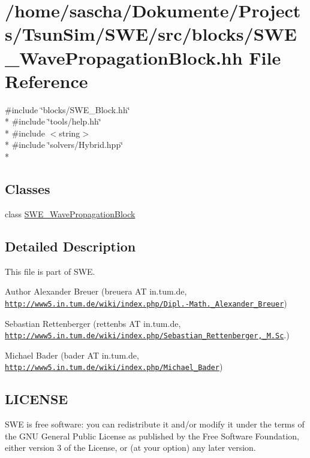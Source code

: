 \hypertarget{SWE__WavePropagationBlock_8hh}{\section{/home/sascha/\-Dokumente/\-Projects/\-Tsun\-Sim/\-S\-W\-E/src/blocks/\-S\-W\-E\-\_\-\-Wave\-Propagation\-Block.hh File Reference}
\label{SWE__WavePropagationBlock_8hh}
}
{\ttfamily \#include \char`\"{}blocks/\-S\-W\-E\-\_\-\-Block.\-hh\char`\"{}}\\*
{\ttfamily \#include \char`\"{}tools/help.\-hh\char`\"{}}\\*
{\ttfamily \#include $<$string$>$}\\*
{\ttfamily \#include \char`\"{}solvers/\-Hybrid.\-hpp\char`\"{}}\\*
\subsection*{Classes}
\begin{DoxyCompactItemize}
\item 
class \hyperlink{classSWE__WavePropagationBlock}{S\-W\-E\-\_\-\-Wave\-Propagation\-Block}
\end{DoxyCompactItemize}


\subsection{Detailed Description}
This file is part of S\-W\-E.

\begin{DoxyAuthor}{Author}
Alexander Breuer (breuera A\-T in.\-tum.\-de, \href{http://www5.in.tum.de/wiki/index.php/Dipl.-Math._Alexander_Breuer}{\tt http\-://www5.\-in.\-tum.\-de/wiki/index.\-php/\-Dipl.-\/\-Math.\-\_\-\-Alexander\-\_\-\-Breuer}) 

Sebastian Rettenberger (rettenbs A\-T in.\-tum.\-de, \href{http://www5.in.tum.de/wiki/index.php/Sebastian_Rettenberger,_M.Sc}{\tt http\-://www5.\-in.\-tum.\-de/wiki/index.\-php/\-Sebastian\-\_\-\-Rettenberger,\-\_\-\-M.\-Sc}.) 

Michael Bader (bader A\-T in.\-tum.\-de, \href{http://www5.in.tum.de/wiki/index.php/Michael_Bader}{\tt http\-://www5.\-in.\-tum.\-de/wiki/index.\-php/\-Michael\-\_\-\-Bader})
\end{DoxyAuthor}
\hypertarget{Writer_8hh_LICENSE}{}\subsection{L\-I\-C\-E\-N\-S\-E}\label{Writer_8hh_LICENSE}
S\-W\-E is free software\-: you can redistribute it and/or modify it under the terms of the G\-N\-U General Public License as published by the Free Software Foundation, either version 3 of the License, or (at your option) any later version.

